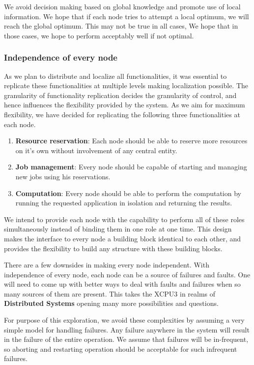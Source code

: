 \documentclass[conference]{IEEEtran}
\begin{document}
We avoid decision making based on global knowledge and promote use of local
information.  We hope that if each node tries to attempt a local optimum, we
will reach the global optimum.  This may not be true in all cases, We hope
that in those cases, we hope to perform acceptably well if not optimal.


\subsubsection{Independence of every node}
As we plan to distribute and localize all functionalities, it was essential to
replicate these functionalities at multiple levels making localization
possible.  The granularity of functionality replication decides the granularity of control,
and hence influences the flexibility provided by the system.  As we aim for 
maximum flexibility, we have decided for replicating the following three
functionalities at each node.
\begin{enumerate}
\item \textbf{Resource reservation}: Each node should be able to reserve more
resources on it's own without involvement of any central entity.

\item \textbf{Job management}: Every node should be capable of starting and
managing new jobs using his reservations.

\item \textbf{Computation}: Every node should be able to perform the
computation by running the requested application in isolation and returning
the results.
\end{enumerate}

We intend to provide each node with the capability to perform all of these roles
simultaneously instead of binding them in one role at one time.  This design
makes the interface to every node a building block identical to each other, 
and provides the flexibility to build any structure with these building blocks.

There are a few downsides in making every node independent.  With independence
of every node, each node can be a source of failures and faults.
One will need to come up with better ways to deal with faults and
failures when so many sources of them are present.  This takes the XCPU3 in
realms of \textbf{Distributed Systems} opening many more possibilities and
questions.

For purpose of this exploration, we avoid these complexities by assuming a very
simple model for handling failures.  Any failure anywhere in the system will
result in the failure of the entire operation.  We assume that failures will
be in-frequent, so aborting and restarting operation should be acceptable for
such infrequent failures.
\end{document}

